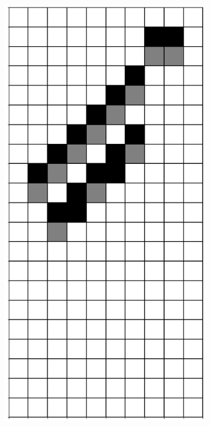 \documentclass[12pt]{article}
\numberwithin{figure}{section} %
\begin{document}
\begin{figure}[H]
\begin{subfigure}{0.3\textwidth}
     \subcaption{}
   \end{subfigure}
        \begin{subfigure}{0.3\textwidth}
     \centering
     \includegraphics[angle=270,width=\linewidth]{Section4/23.8}

\end{subfigure}
\end{figure}
\end{document}
